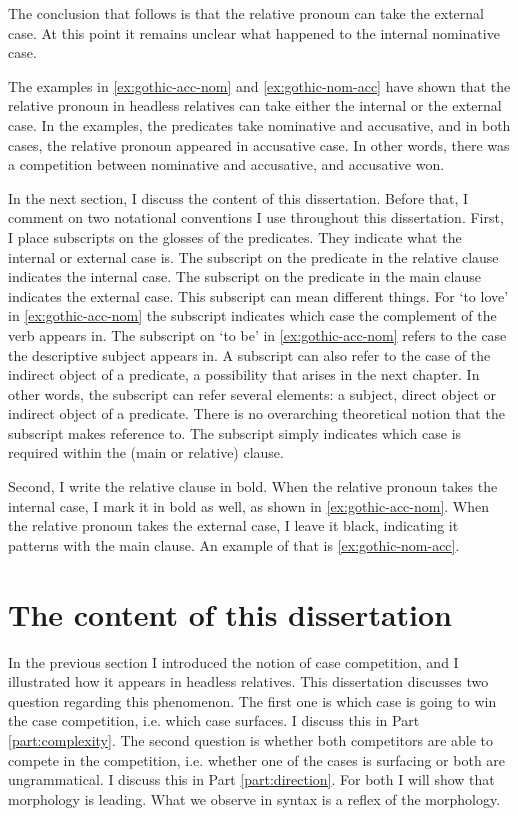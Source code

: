 The conclusion that follows is that the relative pronoun can take the external case. At this point it remains unclear what happened to the internal nominative case.

The examples in \ref{ex:gothic-acc-nom} and \ref{ex:gothic-nom-acc} have shown that the relative pronoun in headless relatives can take either the internal or the external case. In the examples, the predicates take nominative and accusative, and in both cases, the relative pronoun appeared in accusative case. In other words, there was a competition between nominative and accusative, and accusative won.

In the next section, I discuss the content of this dissertation. Before that, I comment on two notational conventions I use throughout this dissertation. First, I place subscripts on the glosses of the predicates. They indicate what the internal or external case is. The subscript on the predicate in the relative clause indicates the internal case. The subscript on the predicate in the main clause indicates the external case. This subscript can mean different things.
For  `to love' in \ref{ex:gothic-acc-nom} the subscript indicates which case the complement of the verb appears in. The subscript on  `to be' in \ref{ex:gothic-acc-nom} refers to the case the descriptive subject appears in. A subscript can also refer to the case of the indirect object of a predicate, a possibility that arises in the next chapter.
In other words, the subscript can refer several elements: a subject, direct object or indirect object of a predicate. There is no overarching theoretical notion that the subscript makes reference to. The subscript simply indicates which case is required within the (main or relative) clause.

Second, I write the relative clause in bold. When the relative pronoun takes the internal case, I mark it in bold as well, as shown in \ref{ex:gothic-acc-nom}. When the relative pronoun takes the external case, I leave it black, indicating it patterns with the main clause. An example of that is \ref{ex:gothic-nom-acc}.


\section{The content of this dissertation}

In the previous section I introduced the notion of case competition, and I illustrated how it appears in headless relatives. This dissertation discusses two question regarding this phenomenon.
The first one is which case is going to win the case competition, i.e. which case surfaces. I discuss this in Part \ref{part:complexity}.
The second question is whether both competitors are able to compete in the competition, i.e. whether one of the cases is surfacing or both are ungrammatical. I discuss this in Part \ref{part:direction}.
For both I will show that morphology is leading. What we observe in syntax is a reflex of the morphology.

